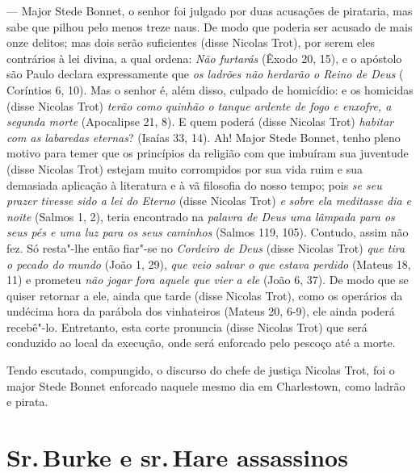 --- Major Stede Bonnet, o senhor foi julgado por duas acusações de pirataria,
mas sabe que pilhou pelo menos treze naus. De modo que poderia ser acusado
de mais onze delitos; mas dois serão suficientes (disse Nicolas Trot), por
serem eles contrários à lei divina, a qual ordena: \textit{Não furtarás}
(Êxodo 20, 15), e o apóstolo são Paulo declara expressamente que
\textit{os ladrões não herdarão o Reino de Deus} ( Coríntios 6, 10). Mas
o senhor é, além disso, culpado de homicídio: e os homicidas (disse
Nicolas Trot) \textit{terão como quinhão o tanque ardente de fogo e
enxofre, a segunda morte} (Apocalipse 21, 8). E quem poderá (disse Nicolas
Trot) \textit{habitar com as labaredas eternas}? (Isaías 33, 14). Ah!
Major Stede Bonnet, tenho pleno motivo para temer que os princípios da
religião com que imbuíram sua juventude (disse Nicolas Trot) estejam muito
corrompidos por sua vida ruim e sua demasiada aplicação à literatura e à
vã filosofia do nosso tempo; pois \textit{se seu prazer tivesse sido a lei
do Eterno} (disse Nicolas Trot) \textit{e} \textit{sobre ela meditasse
dia e noite} (Salmos 1, 2), teria encontrado na\textit{ palavra de Deus
uma lâmpada para os seus pés e uma luz para os seus caminhos} (Salmos 119, 105). 
Contudo, assim não fez. Só resta"-lhe então fiar"-se no
\textit{Cordeiro de Deus} (disse Nicolas Trot) \textit{que tira o pecado
do mundo} (João 1, 29), \textit{que veio salvar o que estava perdido}
(Mateus 18, 11) e prometeu \textit{não jogar fora aquele que vier a ele}
(João 6, 37). De modo que se quiser retornar a ele, ainda que tarde (disse
Nicolas Trot), como os operários da undécima hora da parábola dos
vinhateiros (Mateus 20, 6-9), ele ainda poderá recebê"-lo. Entretanto, esta
corte pronuncia (disse Nicolas Trot) que será conduzido ao local da
execução, onde será enforcado pelo pescoço até a morte.

Tendo escutado, compungido, o discurso do chefe de justiça Nicolas Trot,
foi o major Stede Bonnet enforcado naquele mesmo dia em Charlestown, como
ladrão e pirata.

\chapter[Sr.\,Burke e sr.\,Hare assassinos \bigskip]{Sr.\,Burke e sr.\,Hare assassinos}

